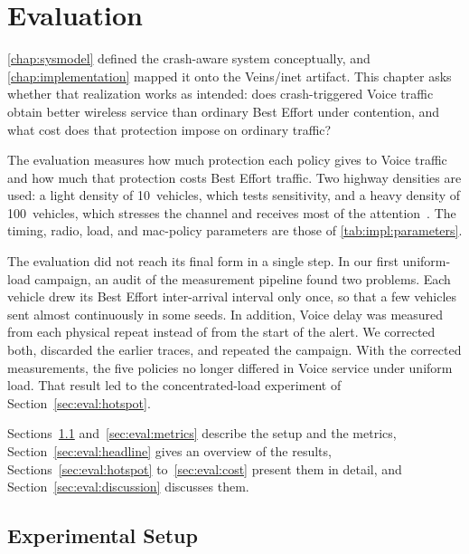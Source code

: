 \chapter{Evaluation}
\label{chap:evaluation}

\autoref{chap:sysmodel} defined the crash-aware system conceptually, and \autoref{chap:implementation} mapped it onto the Veins/\gls{inet} artifact.
This chapter asks whether that realization works as intended: does crash-triggered Voice traffic obtain better wireless service than ordinary Best Effort under contention, and what cost does that protection impose on ordinary traffic?

The evaluation measures how much protection each policy gives to Voice traffic and how much that protection costs Best Effort traffic.
Two highway densities are used: a light density of 10~vehicles, which tests sensitivity, and a heavy density of 100~vehicles, which stresses the channel and receives most of the attention~\cite{aguiar2026_veins_qos}.
The timing, radio, load, and \gls{mac}-policy parameters are those of \autoref{tab:impl:parameters}.

The evaluation did not reach its final form in a single step.
In our first uniform-load campaign, an audit of the measurement pipeline found two problems.
Each vehicle drew its Best Effort inter-arrival interval only once, so that a few vehicles sent almost continuously in some seeds.
In addition, Voice delay was measured from each physical repeat instead of from the start of the alert.
We corrected both, discarded the earlier traces, and repeated the campaign.
With the corrected measurements, the five policies no longer differed in Voice service under uniform load.
That result led to the concentrated-load experiment of Section~\ref{sec:eval:hotspot}.

Sections~\ref{sec:eval:setup} and~\ref{sec:eval:metrics} describe the setup and the metrics, Section~\ref{sec:eval:headline} gives an overview of the results, Sections~\ref{sec:eval:hotspot} to~\ref{sec:eval:cost} present them in detail, and Section~\ref{sec:eval:discussion} discusses them.

\section{Experimental Setup}
\label{sec:eval:setup}

